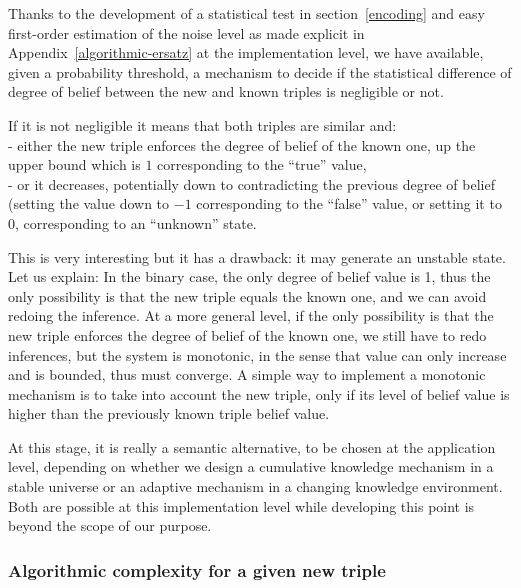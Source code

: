 \documentclass[sn-mathphys]{sn-jnl}
\begin{document}
Thanks to the development of a statistical test in section~\ref{encoding} and easy first-order estimation of the noise level as made explicit in Appendix~\ref{algorithmic-ersatz} at the implementation level, we have available, given a probability threshold, a mechanism to decide if the statistical difference of degree of belief between the new and known triples is negligible or not.

If it is not negligible it means that both triples are similar and:
\\- either the new triple enforces the degree of belief of the known one, up the upper bound which is $1$ corresponding to the ``true'' value,
\\- or it decreases, potentially down to contradicting the previous degree of belief (setting the value down to $-1$ corresponding to the ``false'' value, or setting it to $0$, corresponding to an ``unknown'' state.

This is very interesting but it has a drawback: it may generate an unstable state. Let us explain: In the binary case, the only  degree of belief value is 1, thus the only possibility is that the new triple equals the known one, and we can avoid redoing the inference. At a more general level, if the only possibility is that the new triple enforces the degree of belief of the known one, we still have to redo inferences, but the system is monotonic, in the sense that value can only increase and is bounded, thus must converge. A simple way to implement a monotonic mechanism is to take into account the new triple, only if its level of belief value is higher than the previously known triple belief value.

At this stage, it is really a semantic alternative, to be chosen at the application level, depending on whether we design a cumulative knowledge mechanism in a stable universe or an adaptive mechanism in a changing knowledge environment. Both are possible at this implementation level while developing this point is beyond the scope of our purpose.

\subsubsection{Algorithmic complexity for a given new triple}
\end{document}
